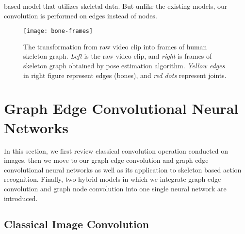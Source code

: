 \documentclass[a4paper,11pt]{article}
\begin{document}
based model that utilizes skeletal data. But unlike the existing models, our convolution is performed on edges instead of nodes.

\begin{figure}
\centering
\texttt{[image: bone-frames]}
\caption{The transformation from raw video clip into frames of human skeleton graph. {\it Left} is the raw video clip, and {\it right} is frames of skeleton graph obtained by pose estimation algorithm. {\it Yellow edges} in right figure represent edges (bones), and {\it red dots} represent joints.}
\label{fig:example}
\end{figure}




\section{Graph Edge Convolutional Neural Networks}

In this section, we first review classical convolution operation conducted on images, then we move to our graph edge convolution and graph edge convolutional neural networks as well as its application to skeleton based action recognition. Finally, two hybrid models in which we integrate graph edge convolution and graph node convolution into one single neural network are introduced.





\subsection{Classical Image Convolution}
\end{document}
